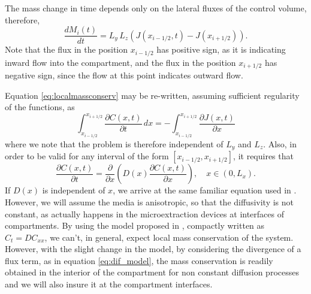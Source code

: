 \documentclass[final,1p,times]{elsarticle}
\begin{document}
The mass change in time depends only on the lateral fluxes of the control volume, therefore,
\begin{equation}
\frac{d M_{i}(t)}{dt}= L_y\, L_z (J(x_{i-1/2}, t)-J(x_{i+1/2})).
\label{eq:localmassconserv}
\end{equation}
Note that the flux in the position $x_{i-1/2}$ has positive sign, as it is indicating inward flow into the compartment, and the flux in the position $x_{i+1/2}$ has negative sign, since the flow at this point indicates outward flow.


Equation \eqref{eq:localmassconserv} may be re-written, assuming sufficient regularity of the functions, as
\begin{equation}
\int_{x_{i-1/2}}^{x_{i+1/2}} \frac{\partial C(x,t) }{\partial t}  \,dx =  -\int_{x_{i-1/2}}^{x_{i+1/2}}\frac{\partial J(x,t)}{\partial x} 
\end{equation}
where we note that the problem is therefore independent of $L_y$ and $L_z$. Also,  in order to be valid for any interval of the form $[x_{i-1/2}, x_{i+1/2}]$, it requires that
\begin{equation}
\frac{\partial C(x,t) }{\partial t}=\frac{\partial  }{\partial x}
\left(D(x) \frac{\partial C(x,t)}{\partial x}\right), \quad x\in (0, L_x).
\label{eq:dif_model}
\end{equation}
If $D(x)$ is independent of $x$, we arrive at the same familiar equation used in \citet{zhang1993headspace}. However, we will assume the media is anisotropic, so that the diffusivity is not constant, as actually happens in the microextraction devices at interfaces of compartments. By using the model proposed in \citet{zhang1993headspace}, compactly written as $C_t=DC_{xx}$, we can't, in general, expect local mass conservation of the system. However, with the slight change in the model, by considering the divergence of a flux term, as in equation \eqref{eq:dif_model}, the mass conservation is readily obtained in the interior of the compartment for non constant diffusion processes and we will also insure it at the compartment interfaces.
\end{document}
